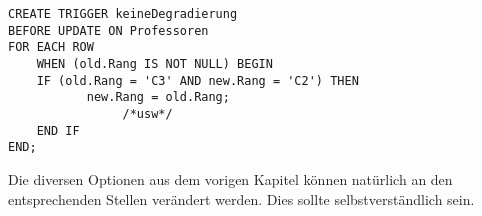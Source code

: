 \begin{lstlisting}[caption={Trigger Beispiel SQL}]
CREATE TRIGGER keineDegradierung
BEFORE UPDATE ON Professoren
FOR EACH ROW
    WHEN (old.Rang IS NOT NULL) BEGIN
    IF (old.Rang = 'C3' AND new.Rang = 'C2') THEN
           new.Rang = old.Rang;
                /*usw*/
    END IF
END;
\end{lstlisting}

Die diversen Optionen aus dem vorigen Kapitel können natürlich an den entsprechenden Stellen verändert werden. Dies sollte selbstverständlich sein.
